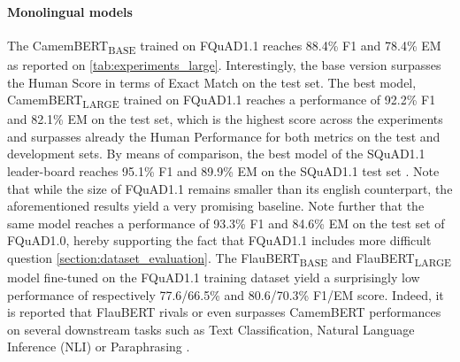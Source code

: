 \documentclass{article}
\begin{document}
\begin{table}[ht]
    \small
    \centering
    \renewcommand{\arraystretch}{1.3}
    \caption{Results of the experiments for various monolingual and multilingual models carried out on the training dataset of \textbf{FQuAD1.0-train} and evaluated on test and development sets of FQuAD1.1}
    \label{tab:experiments_base}
\end{table}

\paragraph{Monolingual models}
The CamemBERT\textsubscript{BASE} trained on FQuAD1.1 reaches 88.4\% F1 and 78.4\% EM as reported on \ref{tab:experiments_large}.
Interestingly, the base version surpasses the Human Score in terms of Exact Match on the test set.
The best model, CamemBERT\textsubscript{LARGE} trained on FQuAD1.1 reaches a performance of 92.2\% F1 and 82.1\% EM on the test set, which is the highest score across the experiments and surpasses already the Human Performance for both metrics on the test and development sets.
By means of comparison, the best model of the SQuAD1.1 leader-board reaches 95.1\% F1 and 89.9\% EM on the SQuAD1.1 test set \citep{xlnet}.
Note that while the size of FQuAD1.1 remains smaller than its english counterpart, the aforementioned results yield a very promising baseline.
Note further that the same model reaches a performance of 93.3\% F1 and 84.6\% EM on the test set of FQuAD1.0, hereby supporting the fact that FQuAD1.1 includes more difficult question \ref{section:dataset_evaluation}.
The FlauBERT\textsubscript{BASE} and FlauBERT\textsubscript{LARGE} model fine-tuned on the FQuAD1.1 training dataset yield a surprisingly low performance of respectively 77.6/66.5\% and 80.6/70.3\% F1/EM score. 
Indeed, it is reported that FlauBERT rivals or even surpasses CamemBERT performances on several downstream tasks such as Text Classification, Natural Language Inference (NLI) or Paraphrasing \citep{flaubert}.
\end{document}
